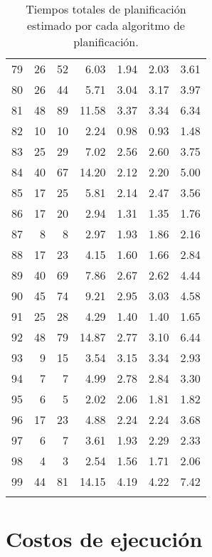 \begin{longtable}{rrrrrrr}
   79 &  26 &  52 & 6.03 & 1.94 & 2.03 & 3.61 \\ 
   80 &  26 &  44 & 5.71 & 3.04 & 3.17 & 3.97 \\ 
   81 &  48 &  89 & 11.58 & 3.37 & 3.34 & 6.34 \\ 
   82 &  10 &  10 & 2.24 & 0.98 & 0.93 & 1.48 \\ 
   83 &  25 &  29 & 7.02 & 2.56 & 2.60 & 3.75 \\ 
   84 &  40 &  67 & 14.20 & 2.12 & 2.20 & 5.00 \\ 
   85 &  17 &  25 & 5.81 & 2.14 & 2.47 & 3.56 \\ 
   86 &  17 &  20 & 2.94 & 1.31 & 1.35 & 1.76 \\ 
   87 &   8 &   8 & 2.97 & 1.93 & 1.86 & 2.16 \\ 
   88 &  17 &  23 & 4.15 & 1.60 & 1.66 & 2.84 \\ 
   89 &  40 &  69 & 7.86 & 2.67 & 2.62 & 4.44 \\ 
   90 &  45 &  74 & 9.21 & 2.95 & 3.03 & 4.58 \\ 
   91 &  25 &  28 & 4.29 & 1.40 & 1.40 & 1.65 \\ 
   92 &  48 &  79 & 14.87 & 2.77 & 3.10 & 6.44 \\ 
   93 &   9 &  15 & 3.54 & 3.15 & 3.34 & 2.93 \\ 
   94 &   7 &   7 & 4.99 & 2.78 & 2.84 & 3.30 \\ 
   95 &   6 &   5 & 2.02 & 2.06 & 1.81 & 1.82 \\ 
   96 &  17 &  23 & 4.88 & 2.24 & 2.24 & 3.68 \\ 
   97 &   6 &   7 & 3.61 & 1.93 & 2.29 & 2.33 \\ 
   98 &   4 &   3 & 2.54 & 1.56 & 1.71 & 2.06 \\ 
   99 &  44 &  81 & 14.15 & 4.19 & 4.22 & 7.42 \\ 
   \hline
\caption{Tiempos totales de planificación estimado por cada algoritmo de planificación.}
\label{table:makespans}
\end{longtable}


\section{Costos de ejecución}

